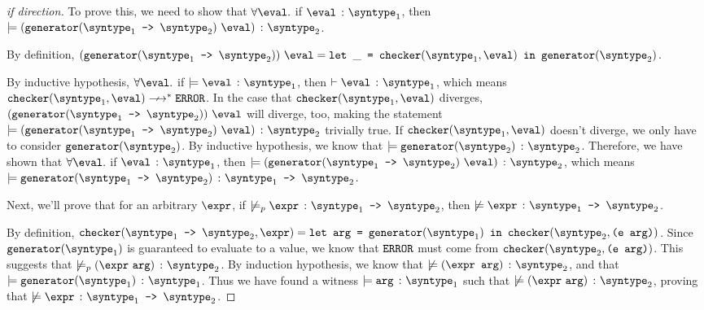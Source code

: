\begin{proof}[if direction]
  To prove this, we need to show that $\forall\eval.$ if $\hastype{\eval}{\syntype_1}$, then $\models \hastype{(\mkgen{\mkfun{\syntype_1}{\syntype_2}} \ \eval)}{\syntype_2}$.
  
  By definition, $(\mkgen{\mkfun{\syntype_1}{\syntype_2}}) \ \eval = \letin{\_}{\mkche{\syntype_1}{\eval}}{\mkgen{\syntype_2}}$.

  By inductive hypothesis, $\forall\eval.$ if $\models \hastype{\eval}{\syntype_1}$, then $\vdash \hastype{\eval}{\syntype_1}$, which means $\mkche{\syntype_1}{\eval}\nsmallsteps[] \eerror$. In the case that $\mkche{\syntype_1}{\eval}$ diverges, $(\mkgen{\mkfun{\syntype_1}{\syntype_2}}) \ \eval$ will diverge, too, making the statement $\models \hastype{(\mkgen{\mkfun{\syntype_1}{\syntype_2}} \ \eval)}{\syntype_2}$ trivially true. If $\mkche{\syntype_1}{\eval}$ doesn't diverge, we only have to consider $\mkgen{\syntype_2}$. By inductive hypothesis, we know that $\models \hastype{\mkgen{\syntype_2}}{\syntype_2}$. Therefore, we have shown that $\forall\eval.$ if $\hastype{\eval}{\syntype_1}$, then $\models \hastype{(\mkgen{\mkfun{\syntype_1}{\syntype_2}} \ \eval)}{\syntype_2}$, which means $\models \hastype{\mkgen{\mkfun{\syntype_1}{\syntype_2}}}{\mkfun{\syntype_1}{\syntype_2}}$.

  Next, we'll prove that for an arbitrary $\expr$, if $\not\models_p \hastype{\expr}{\mkfun{\syntype_1}{\syntype_2}}$, then $\not\models \hastype{\expr}{\mkfun{\syntype_1}{\syntype_2}}$.

  By definition, $\mkche{\mkfun{\syntype_1}{\syntype_2}}{\expr} = \texttt{let arg = }\mkgen{\syntype_1} \texttt{ in }\mkche{\syntype_2}{\texttt{(e arg)}}$. Since $\mkgen{\syntype_1}$ is guaranteed to evaluate to a value, we know that $\texttt{ERROR}$ must come from $\mkche{\syntype_2}{\texttt{(e arg)}}$. This suggests that $\not\models_p \hastype{(\expr\ \texttt{arg})}{\syntype_2}$. By induction hypothesis, we know that $\not\models \hastype{(\texttt{\expr\ \texttt{arg}})}{\syntype_2}$, and that $\models \hastype{\mkgen{\syntype_1}}{\syntype_1}$. Thus we have found a witness $\models \hastype{\texttt{arg}}{\syntype_1}$ such that $\not\models \hastype{(\expr \ \texttt{arg})}{\syntype_2}$, proving that $\not\models \hastype{\expr}{\mkfun{\syntype_1}{\syntype_2}}$.

\end{proof}

